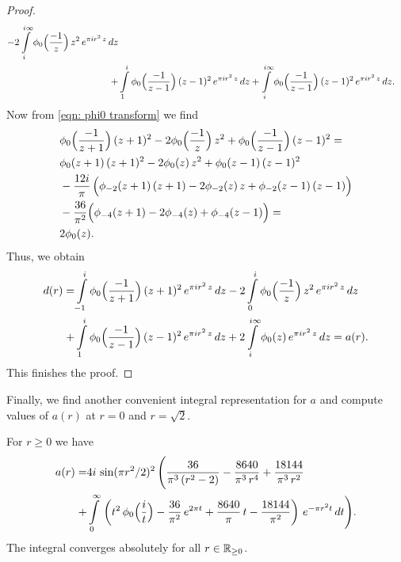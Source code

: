 \begin{proof}
\begin{align}
    -2\int\limits_{i}^{i\infty}\phi_0\Big(\frac{-1}{z}\Big)\,z^2\,e^{\pi i r^2 \,z}\,dz\notag\\
    +&\int\limits_{1}^{i}\phi_0\Big(\frac{-1}{z-1}\Big)\,(z-1)^2\,e^{\pi i r^2 \,z}\,dz
    +\int\limits_{i}^{i\infty}\phi_0\Big(\frac{-1}{z-1}\Big)\,(z-1)^2\,e^{\pi i r^2 \,z}\,dz.\notag
\end{align}
Now from \eqref{eqn: phi0 transform} we find
\begin{align}&\phi_0\Big(\frac{-1}{z+1}\Big)\,(z+1)^2-2\phi_0\Big(\frac{-1}{z}\Big)\,z^2+
\phi_0\Big(\frac{-1}{z-1}\Big)\,(z-1)^2=\notag\\
&\phi_0(z+1)\,(z+1)^2-2\phi_0(z)\,z^2+\phi_0(z-1)\,(z-1)^2\notag\\
&-\frac{12i}{\pi}\,\Big(\phi_{-2}(z+1)\,(z+1)-2\phi_{-2}(z)\,z+\phi_{-2}(z-1)\,(z-1)\Big)\notag\\
&-\frac{36}{\pi^2}\Big(\phi_{-4}(z+1)-2\phi_{-4}(z)+\phi_{-4}(z-1)\Big)=\notag\\
&2\phi_0(z).
    \end{align}
    Thus, we obtain
    \begin{align}
    d(r)=&\int\limits_{-1}^{i}\phi_0\Big(\frac{-1}{z+1}\Big)\,(z+1)^2\,e^{\pi i r^2 \,z}\,dz
    -2\int\limits_{0}^{i}\phi_0\Big(\frac{-1}{z}\Big)\,z^2\,e^{\pi i r^2 \,z}\,dz\notag\\
    +&\int\limits_{1}^{i}\phi_0\Big(\frac{-1}{z-1}\Big)\,(z-1)^2\,e^{\pi i r^2 \,z}\,dz
    +2\int\limits_{i}^{i\infty}\phi_0(z)\,e^{\pi i r^2 \,z}\,dz=a(r).\notag
\end{align}
This finishes the proof.
\end{proof}
Finally, we find another convenient integral representation for $a$ and compute values of $a(r)$ at $r=0$ and $r=\sqrt{2}$.
\begin{proposition}\label{prop: a another integral}
For $r\geq0$ we have
\begin{align}\label{eqn: a another integral}a(r)=&4i\,\sin(\pi r^2/2)^2\,\Bigg(\frac{36}{\pi^3\,(r^2-2)}-\frac{8640}{\pi^3\,r^4}+\frac{18144}{\pi^3\,r^2}\\ +&\int\limits_0^\infty\,\left(t^2\,\phi_0\Big(\frac{i}{t}\Big)-\frac{36}{\pi^2}\,e^{2\pi t}+\frac{8640}{\pi}\,t-\frac{18144}{\pi^2}\right)\,e^{-\pi r^2 t}\,dt \Bigg) .\notag\end{align}
The integral converges absolutely for all $r\in\mathbb{R}_{\geq 0}$.
\end{proposition}
